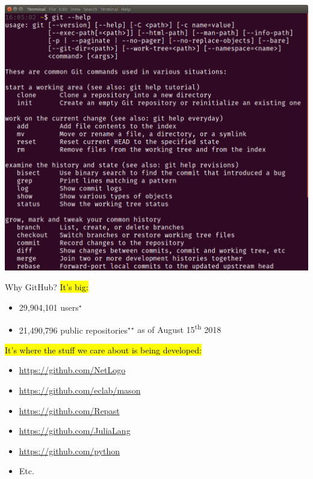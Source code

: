 \documentclass{beamer}
\newcommand\st[1]{\hl{\larger #1}\par}
\newcommand\nt[1]{\textcolor{black!40}{#1}}
\begin{document}
\begin{frame}
  \centering
  \includegraphics[height=\textheight]{githelp}
\end{frame}

\begin{frame}{Why GitHub?}\large
  \st{It's big:}
  \begin{itemize}
    \item 29,904,101 users\nt{$^\star$}
    \item 21,490,796 public repositories\nt{$^\star$}\hfill\nt{$^\star$ as of August 15\textsuperscript{th} 2018}
  \end{itemize}
  \vfill\st{It's where the stuff we care about is being developed:}
  \begin{itemize}
    \item \url{https://github.com/NetLogo}
    \item \url{https://github.com/eclab/mason}
    \item \url{https://github.com/Repast}
    \item \url{https://github.com/JuliaLang}
    \item \url{https://github.com/python}
    \item Etc.
  \end{itemize}
\end{frame}
\end{document}
